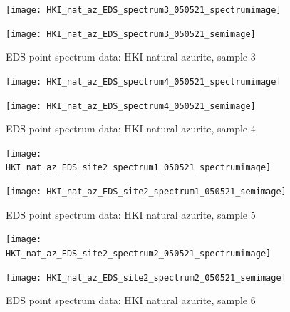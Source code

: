 \begin{figure}[H]
\centering
\begin{minipage}{.45\textwidth}
  \centering
  \texttt{[image: HKI\_nat\_az\_EDS\_spectrum3\_050521\_spectrumimage]}
\end{minipage}
\begin{minipage}{.45\textwidth}
  \centering
  \texttt{[image: HKI\_nat\_az\_EDS\_spectrum3\_050521\_semimage]}
\end{minipage}
\caption[EDS point spectrum data: HKI natural azurite, sample 3]{EDS point spectrum data: HKI natural azurite, sample 3}
\label{fig:hki_point_eds_3}
\end{figure}

\begin{figure}[H]
\centering
\begin{minipage}{.45\textwidth}
  \centering
  \texttt{[image: HKI\_nat\_az\_EDS\_spectrum4\_050521\_spectrumimage]}
\end{minipage}
\begin{minipage}{.45\textwidth}
  \centering
  \texttt{[image: HKI\_nat\_az\_EDS\_spectrum4\_050521\_semimage]}
\end{minipage}
\caption[EDS point spectrum data: HKI natural azurite, sample 4]{EDS point spectrum data: HKI natural azurite, sample 4}
\label{fig:hki_point_eds_4}
\end{figure}

\begin{figure}[H]
\centering
\begin{minipage}{.45\textwidth}
  \centering
  \texttt{[image: HKI\_nat\_az\_EDS\_site2\_spectrum1\_050521\_spectrumimage]}
\end{minipage}
\begin{minipage}{.45\textwidth}
  \centering
  \texttt{[image: HKI\_nat\_az\_EDS\_site2\_spectrum1\_050521\_semimage]}
\end{minipage}
\caption[EDS point spectrum data: HKI natural azurite, sample 5]{EDS point spectrum data: HKI natural azurite, sample 5}
\label{fig:hki_point_eds_5}
\end{figure}

\begin{figure}[H]
\centering
\begin{minipage}{.45\textwidth}
  \centering
  \texttt{[image: HKI\_nat\_az\_EDS\_site2\_spectrum2\_050521\_spectrumimage]}
\end{minipage}
\begin{minipage}{.45\textwidth}
  \centering
  \texttt{[image: HKI\_nat\_az\_EDS\_site2\_spectrum2\_050521\_semimage]}
\end{minipage}
\caption[EDS point spectrum data: HKI natural azurite, sample 6]{EDS point spectrum data: HKI natural azurite, sample 6}
\label{fig:hki_point_eds_6}
\end{figure}


